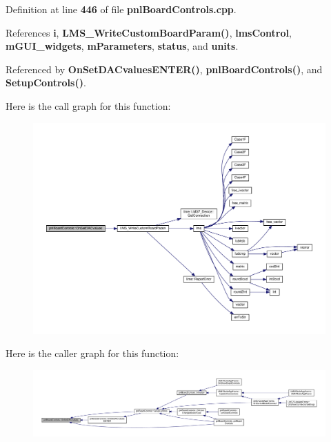 Definition at line {\bf 446} of file {\bf pnl\+Board\+Controls.\+cpp}.



References {\bf i}, {\bf L\+M\+S\+\_\+\+Write\+Custom\+Board\+Param()}, {\bf lms\+Control}, {\bf m\+G\+U\+I\+\_\+widgets}, {\bf m\+Parameters}, {\bf status}, and {\bf units}.



Referenced by {\bf On\+Set\+D\+A\+Cvalues\+E\+N\+T\+E\+R()}, {\bf pnl\+Board\+Controls()}, and {\bf Setup\+Controls()}.



Here is the call graph for this function\+:
\nopagebreak
\begin{figure}[H]
\begin{center}
\leavevmode
\includegraphics[width=350pt]{df/d93/classpnlBoardControls_ab1f3aeef9b75c8d6212cc6e654282e12_cgraph}
\end{center}
\end{figure}




Here is the caller graph for this function\+:
\nopagebreak
\begin{figure}[H]
\begin{center}
\leavevmode
\includegraphics[width=350pt]{df/d93/classpnlBoardControls_ab1f3aeef9b75c8d6212cc6e654282e12_icgraph}
\end{center}
\end{figure}


